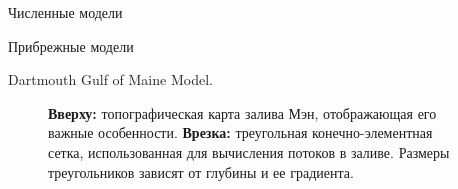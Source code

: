 \begin{chapter}{Численные модели}
\begin{section}{Прибрежные модели}
\begin{paragraph}{Dartmouth Gulf of Maine Model.}
\begin{figure}[t!]
\caption{\textbf{Вверху:} топографическая карта залива Мэн, отображающая 
его важные особенности.
\textbf{Врезка:} треугольная конечно-элементная сетка, использованная для
вычисления потоков в заливе. Размеры треугольников зависят от глубины и ее
градиента.~\cite{Lynch:1996}}
\label{fig:GulfofMaine}
\end{figure}
%


\end{paragraph}
\end{section}
\end{chapter}
